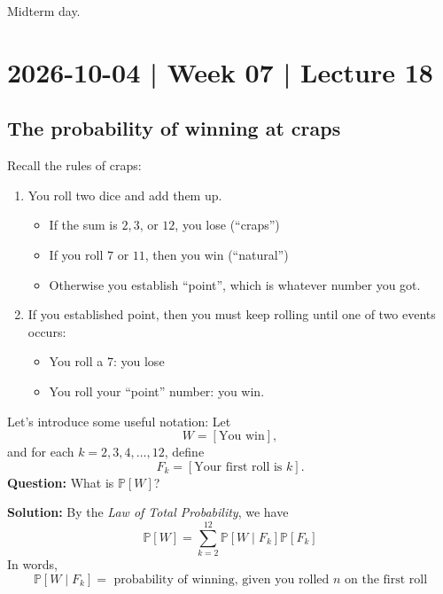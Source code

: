 \documentclass[10pt]{article}
\theoremstyle{definition}
\newcommand{\vt}{\vskip 5mm} %
\newcommand{\fl}{\noindent\textbf} %
\newcommand{\Fl}{\vt\noindent\textbf} %
\newcommand{\1}[1]{\textbf{1}_{\left[#1\right]}} %
\def\P{\mathbb{P}} %
\begin{document}
Midterm day.
\newpage
\section{2026-10-04 | Week 07 | Lecture 18}

\subsection{The probability of winning at craps}

Recall the rules of craps:
\begin{enumerate} 
  \item You roll two dice and add them up.
  \begin{itemize}
    \item If the sum is $2,3$, or $12$, you lose (``craps'')
    \item If you roll $7$ or $11$, then you win  (``natural'')
    \item Otherwise you establish ``point'', which is whatever number you got.
  \end{itemize}
  \item If you established point, then you must keep rolling until one of two events occurs:
  \begin{itemize}
    \item You roll a 7: you lose
    \item You roll your ``point'' number: you win.
  \end{itemize}
\end{enumerate}

Let's introduce some useful notation:
Let
\begin{equation*}
  W= \left[ \text{You win} \right],
\end{equation*}
and for each $k=2,3,4,\ldots,12$, define
\begin{equation*}
  F_{k}= \left[ \text{Your first roll is }k \right].
\end{equation*}
\Fl{Question:} What is $\P\left[W \right]$?

\fl{Solution:} By the \textit{Law of Total Probability}, we have
\begin{equation}\label{eq:6}
  \P\left[W  \right] =  \sum_{k=2}^{12} \P\left[W\mid F_{k}\right]\P\left[F_{k} \right] 
\end{equation}
In words,
\begin{equation*}
  \P\left[W\mid F_{k}\right] = \text{ probability of winning, given you rolled $n$ on the first roll}
\end{equation*}
\end{document}
